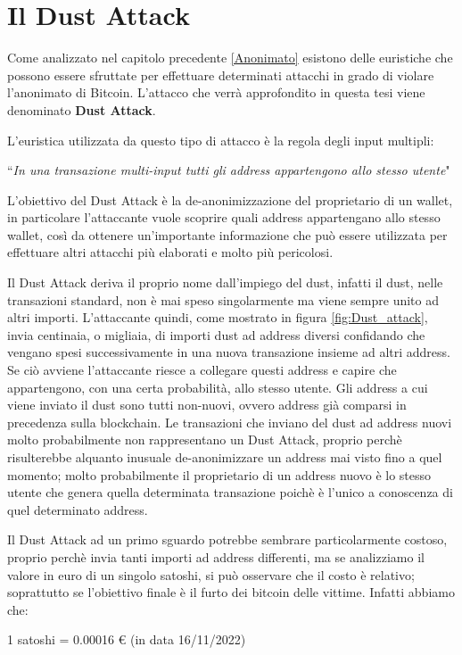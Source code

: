 \section{Il Dust Attack}\label{dstatt}
Come analizzato nel capitolo precedente \ref{Anonimato} esistono delle euristiche che possono essere sfruttate per effettuare determinati attacchi in grado di violare l'anonimato di Bitcoin. L'attacco che verrà approfondito in questa tesi viene denominato \textbf{Dust Attack}. 

L'euristica utilizzata da questo tipo di attacco è la regola degli input multipli:
\begin{center}
    ``\textit{In una transazione multi-input tutti gli address appartengono allo stesso utente}"
\end{center}
L'obiettivo del Dust Attack è la de-anonimizzazione del proprietario di un wallet, in particolare l'attaccante vuole scoprire quali address appartengano allo stesso wallet, così da ottenere un'importante informazione che può essere utilizzata per effettuare altri attacchi più elaborati e molto più pericolosi.

Il Dust Attack deriva il proprio nome dall'impiego del dust, infatti il dust, nelle transazioni standard, non è mai speso singolarmente ma viene sempre unito ad altri importi. L'attaccante quindi, come mostrato in figura \ref{fig:Dust_attack}, invia centinaia, o migliaia, di importi dust ad address diversi confidando che vengano spesi successivamente in una nuova transazione insieme ad altri address. Se ciò avviene l'attaccante riesce a collegare questi address e capire che appartengono, con una certa probabilità, allo stesso utente. Gli address a cui viene inviato il dust sono tutti non-nuovi, ovvero address già comparsi in precedenza sulla blockchain. Le transazioni che inviano del dust ad address nuovi  molto probabilmente non rappresentano un Dust Attack, proprio perchè risulterebbe alquanto inusuale de-anonimizzare un address mai visto fino a quel momento; molto probabilmente il proprietario di un address nuovo è lo stesso utente che genera quella determinata transazione poichè è l'unico a conoscenza di quel determinato address.

Il Dust Attack ad un primo sguardo potrebbe sembrare particolarmente costoso, proprio perchè invia tanti importi ad address differenti, ma se analizziamo il valore in euro di un singolo satoshi, si può osservare che il costo è relativo; soprattutto se l'obiettivo finale è il furto dei bitcoin delle vittime. Infatti abbiamo che:
\begin{center}
    1 satoshi = 0.00016 € (in data 16/11/2022) 
\end{center}

